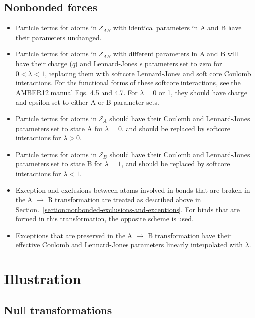 \documentclass[aps,pre,twocolumn,superscriptaddress,nofootinbib]{revtex4-1}
\begin{document}
\subsection{Nonbonded forces}
\begin{itemize}
  \item Particle terms for atoms in $\mathcal{S}_{AB}$ with identical parameters in A and B have their parameters unchanged.
  \item Particle terms for atoms in $\mathcal{S}_{AB }$ with different parameters in A and B will have their charge ($q$) and Lennard-Jones $\epsilon$ parameters set to zero for $0 < \lambda < 1$, replacing them with softcore Lennard-Jones and soft core Coulomb interactions.  For the functional forms of these softcore interactions, see the AMBER12 manual Eqs. 4.5 and 4.7.  For $\lambda = 0$ or 1, they should have charge and epsilon set to either A or B parameter sets.
  \item Particle terms for atoms in $\mathcal{S}_A$ should have their Coulomb and Lennard-Jones parameters set to state A for $\lambda = 0$, and should be replaced by softcore interactions for $\lambda > 0$.
  \item Particle terms for atoms in $\mathcal{S}_B$ should have their Coulomb and Lennard-Jones parameters set to state B for $\lambda = 1$, and should be replaced by softcore interactions for $\lambda < 1$.
  \item Exception and exclusions between atoms involved in bonds that are broken in the A $\rightarrow$ B transformation are treated as described above in Section.~\ref{section:nonbonded-exclusions-and-exceptions}.  For binds that are formed in this transformation, the opposite scheme is used.
  \item Exceptions that are preserved in the A $\rightarrow$ B transformation have their effective Coulomb and Lennard-Jones parameters linearly interpolated with $\lambda$.
\end{itemize}
  


\section{Illustration}

\subsection{Null transformations}
\end{document}
